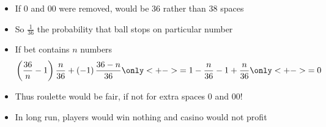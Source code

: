 \documentclass[handout]{beamer}
\theoremstyle{definition}
\begin{document}
\begin{frame}
\begin{itemize}
\item If $0$ and $00$ were removed, would be $36$ rather than $38$ spaces
\item So $\frac{1}{36}$ the probability that ball stops on particular number
\item If bet contains $n$ numbers
\[\left(\frac{36}{n}-1\right)\frac{n}{36}
+\left(-1\right)\frac{36-n}{36}
\only<+->{=1-\frac{n}{36}-1+\frac{n}{36}}
\only<+->{=0}\]
\item Thus roulette would be fair, if not for extra spaces $0$ and $00$!
\item In long run, players would win nothing and casino would not profit
\end{itemize}
\end{frame}
\end{document}
